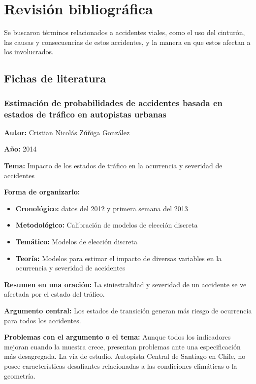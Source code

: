 \documentclass{book}
\begin{document}
\section{Revisión bibliográfica}

Se buscaron términos relacionados a accidentes viales, como el uso del cinturón, las causas y consecuencias de estos accidentes, y la manera en que estos afectan a los involucrados.
\subsection{Fichas de literatura}
\subsubsection{Estimación de probabilidades de accidentes basada en estados de tráfico en autopistas urbanas}
\textbf{Autor:} Cristian Nicolás Zúñiga González

\textbf{Año:} 2014

\textbf{Tema:} Impacto de los estados de tráfico en la ocurrencia y severidad de accidentes

\textbf{Forma de organizarlo:}

\begin{itemize}
\setlength{\itemindent}{0.5in}
    \item \textbf{Cronológico:} datos del 2012 y primera semana del 2013
    \item \textbf{Metodológico:} Calibración de modelos de elección discreta
    \item \textbf{Temático:} Modelos de elección discreta
    \item \textbf{Teoría:} Modelos para estimar el impacto de diversas variables en la ocurrencia y severidad de accidentes
\end{itemize}

\textbf{Resumen en una oración:} La siniestralidad y severidad de un accidente se ve afectada por el estado del tráfico.

\textbf{Argumento central:} Los estados de transición generan más riesgo de ocurrencia para todos los accidentes.

\textbf{Problemas con el argumento o el tema:} Aunque todos los indicadores mejoran cuando la muestra crece, presentan problemas ante una especificación más desagregada. La vía de estudio, Autopista Central de Santiago en Chile, no posee características desafiantes relacionadas a las condiciones climáticas o la geometría.
\end{document}
